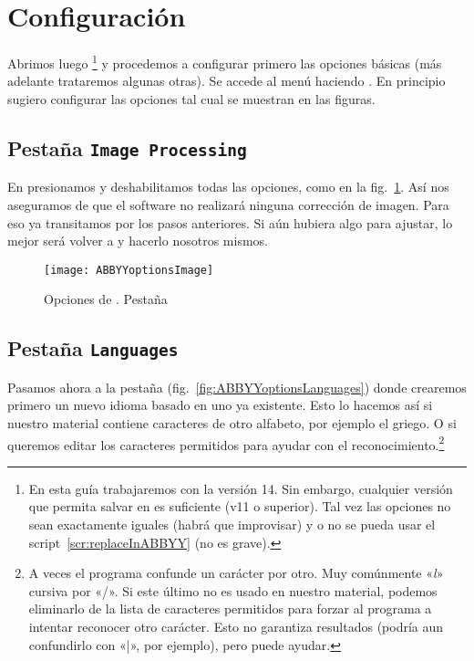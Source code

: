 \documentclass[%
	a5paper,
	10pt,
	twoside,
	openright,
	final,
]{memoir}
\begin{document}
{	\section{Configuración} Abrimos luego \abbyy\footnote{En esta guía trabajaremos con la versión 14. Sin embargo, cualquier versión que permita salvar en \djvu es suficiente (v11 o superior). Tal vez las opciones no sean exactamente iguales (habrá que improvisar) y o no se pueda usar el script~\ref{scr:replaceInABBYY} (no es grave).} y procedemos a configurar primero las opciones básicas (más adelante trataremos algunas otras). Se accede al menú haciendo . En principio sugiero configurar las opciones tal cual se muestran en las figuras.

	\subsection{Pestaña \texttt{Image Processing}} En  presionamos  y deshabilitamos todas las opciones, como en la fig.~\ref{fig:ABBYYoptionsImage}. Así nos aseguramos de que el software no realizará ninguna corrección de imagen. Para eso ya transitamos por los pasos anteriores. Si aún hubiera algo para ajustar, lo mejor será volver a \scantailor y hacerlo nosotros mismos.

	\begin{figure}
		\centering
		\texttt{[image: ABBYYoptionsImage]}
		\caption[Opciones de \abbyy. Pestaña \texttt{Image Processing}]{Opciones de \abbyy. Pestaña \label{fig:ABBYYoptionsImage}}
	\end{figure}

	\subsection{Pestaña \texttt{Languages}} Pasamos ahora a la pestaña  (fig.~\ref{fig:ABBYYoptionsLanguages}) donde crearemos primero un nuevo idioma basado en uno ya existente. Esto lo hacemos así si nuestro material contiene caracteres de otro alfabeto, por ejemplo el griego. O si queremos editar los caracteres permitidos para ayudar con el reconocimiento.\footnote{A veces el programa confunde un carácter por otro. Muy comúnmente «\textit{l}» cursiva por «/». Si este último no es usado en nuestro material, podemos eliminarlo de la lista de caracteres permitidos para forzar al programa a intentar reconocer otro carácter. Esto no garantiza resultados (podría aun confundirlo con «|», por ejemplo), pero puede ayudar.}

}
\end{document}

